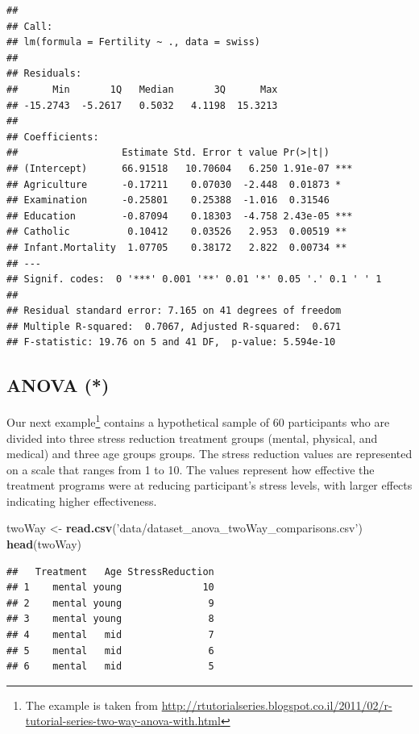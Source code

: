 \documentclass[]{book}
\newenvironment{Shaded}{\begin{snugshade}}{\end{snugshade}}
\newcommand{\KeywordTok}[1]{\textcolor[rgb]{0.13,0.29,0.53}{\textbf{#1}}}
\newcommand{\NormalTok}[1]{#1}
\newcommand{\StringTok}[1]{\textcolor[rgb]{0.31,0.60,0.02}{#1}}
\theoremstyle{definition}
\theoremstyle{definition}
\theoremstyle{definition}
\theoremstyle{remark}
\begin{document}
\begin{verbatim}
## 
## Call:
## lm(formula = Fertility ~ ., data = swiss)
## 
## Residuals:
##      Min       1Q   Median       3Q      Max 
## -15.2743  -5.2617   0.5032   4.1198  15.3213 
## 
## Coefficients:
##                  Estimate Std. Error t value Pr(>|t|)    
## (Intercept)      66.91518   10.70604   6.250 1.91e-07 ***
## Agriculture      -0.17211    0.07030  -2.448  0.01873 *  
## Examination      -0.25801    0.25388  -1.016  0.31546    
## Education        -0.87094    0.18303  -4.758 2.43e-05 ***
## Catholic          0.10412    0.03526   2.953  0.00519 ** 
## Infant.Mortality  1.07705    0.38172   2.822  0.00734 ** 
## ---
## Signif. codes:  0 '***' 0.001 '**' 0.01 '*' 0.05 '.' 0.1 ' ' 1
## 
## Residual standard error: 7.165 on 41 degrees of freedom
## Multiple R-squared:  0.7067, Adjusted R-squared:  0.671 
## F-statistic: 19.76 on 5 and 41 DF,  p-value: 5.594e-10
\end{verbatim}

\hypertarget{anova}{%
\subsection{ANOVA (*)}\label{anova}}

Our next example\footnote{The example is taken from \url{http://rtutorialseries.blogspot.co.il/2011/02/r-tutorial-series-two-way-anova-with.html}} contains a hypothetical sample of \(60\) participants who are divided into three stress reduction treatment groups (mental, physical, and medical) and three age groups groups.
The stress reduction values are represented on a scale that ranges from 1 to 10.
The values represent how effective the treatment programs were at reducing participant's stress levels, with larger effects indicating higher effectiveness.

\begin{Shaded}
\begin{Highlighting}[]
\NormalTok{twoWay <-}\StringTok{ }\KeywordTok{read.csv}\NormalTok{(}\StringTok{'data/dataset_anova_twoWay_comparisons.csv'}\NormalTok{)}
\KeywordTok{head}\NormalTok{(twoWay)}
\end{Highlighting}
\end{Shaded}

\begin{verbatim}
##   Treatment   Age StressReduction
## 1    mental young              10
## 2    mental young               9
## 3    mental young               8
## 4    mental   mid               7
## 5    mental   mid               6
## 6    mental   mid               5
\end{verbatim}
\end{document}
